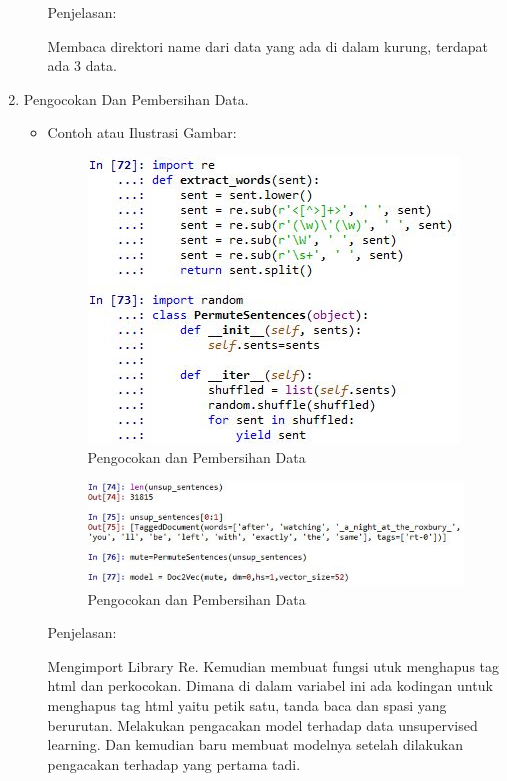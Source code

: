 \begin{enumerate}
\begin{itemize}
Penjelasan:

Membaca direktori name dari data yang ada di dalam kurung, terdapat ada 3 data.

\end{itemize}

\item Pengocokan Dan Pembersihan Data.
\begin{itemize}
\item Contoh atau Ilustrasi Gambar: 

\begin{figure}[!hbtp]
\centering
\includegraphics[scale=0.7]{figures/1174031/5/60.jpg}
\caption{Pengocokan dan Pembersihan Data}
\label{Pengocokan dan Pembersihan Data}
\end{figure}

\begin{figure}[!hbtp]
\centering
\includegraphics[scale=0.7]{figures/1174031/5/61.jpg}
\caption{Pengocokan dan Pembersihan Data}
\label{Pengocokan dan Pembersihan Data}
\end{figure}

Penjelasan:

Mengimport Library Re. Kemudian membuat fungsi utuk menghapus tag html dan perkocokan. Dimana di dalam variabel ini ada kodingan untuk menghapus tag html yaitu petik satu, tanda baca dan spasi yang berurutan. Melakukan pengacakan model terhadap data unsupervised learning. Dan kemudian baru membuat modelnya setelah dilakukan pengacakan terhadap yang pertama tadi.


\end{itemize}
\end{enumerate}
